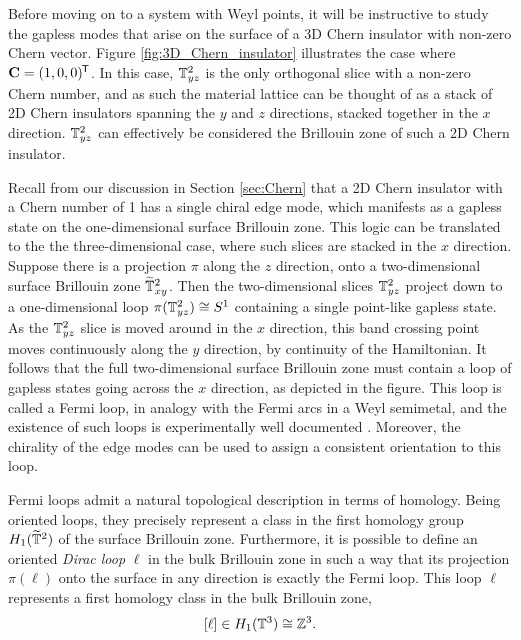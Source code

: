 Before moving on to a system with Weyl points, it will be instructive to study the gapless modes that arise on the surface of a 3D Chern insulator with non-zero Chern vector. Figure \ref{fig:3D_Chern_insulator} illustrates the case where $\vb{C} = (1,0,0)^{\mkern-1.5mu\mathsf{T}}$. In this case, $\mathbb{T}_{yz}^2$ is the only orthogonal slice with a non-zero Chern number, and as such the material lattice can be thought of as a stack of 2D Chern insulators spanning the $y$ and $z$ directions, stacked together in the $x$ direction. $\mathbb{T}_{yz}^2$ can effectively be considered the Brillouin zone of such a 2D Chern insulator.

Recall from our discussion in Section \ref{sec:Chern} that a 2D Chern insulator with a Chern number of 1 has a single chiral edge mode, which manifests as a gapless state on the one-dimensional surface Brillouin zone. %
This logic can be translated to the the three-dimensional case, where such slices are stacked in the $x$ direction. Suppose there is a projection $\pi$ along the $z$ direction, onto a two-dimensional surface Brillouin zone $\widetilde{\mathbb{T}}_{xy}^2$. Then the two-dimensional slices $\mathbb{T}_{yz}^2$ project down to a one-dimensional loop $\pi(\mathbb{T}_{yz}^2)\cong S^1$ containing a single point-like gapless state. As the $\mathbb{T}_{yz}^2$ slice is moved around in the $x$ direction, this band crossing point moves continuously along the $y$ direction, by continuity of the Hamiltonian. It follows that the full two-dimensional surface Brillouin zone must contain a loop of gapless states going across the $x$ direction, as depicted in the figure. This loop is called a Fermi loop, in analogy with the Fermi arcs in a Weyl semimetal, and the existence of such loops is experimentally well documented \red{[references]}. %
Moreover, the chirality of the edge modes can be used to assign a consistent orientation to this loop. %

Fermi loops admit a natural topological description in terms of homology. Being oriented loops, they precisely represent a class in the first homology group $H_1(\widetilde{\mathbb{T}}^2)$ of the surface Brillouin zone. Furthermore, it is possible to define an oriented \emph{Dirac loop} %
$\ell$ in the bulk Brillouin zone in such a way that its projection $\pi(\ell)$ onto the surface in any direction is exactly the Fermi loop. This loop $\ell$ represents a first homology class in the bulk Brillouin zone,
\[
	[\ell]\in H_1(\mathbb{T}^3)\cong\mathbb{Z}^3.
\]

